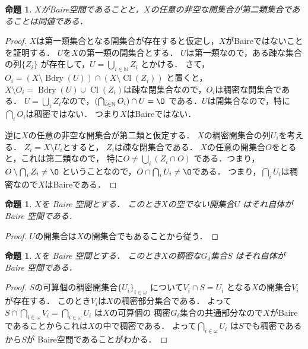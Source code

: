 \documentclass[leqno, 12pt]{jsarticle}
\newtheorem{prop}[thm]{命題}
\newcommand{\nn}{\mathbb{N}}
\DeclareMathOperator{\bd}{Bdry}
\DeclareMathOperator{\cl}{Cl}
\newcommand{\myom}{\omega}
\begin{document}
\begin{prop}
$X$がBaire空間であることと，$X$の任意の非空な開集合が第二類集合であることは同値である．
\end{prop}
\begin{proof}
$X$は第一類集合となる開集合が存在すると仮定し，$X$がBaireではないことを証明する．
$U$を$X$の第一類の開集合とする．
$U$は第一類なので，ある疎な集合の列$\{Z_i\}$
が存在して，$U=\bigcup_{i\in \nn}Z_i$
とかける．
さて，$O_i=(X\setminus \bd(U))\cap (X\setminus\cl(Z_i))$
と置くと，$X\setminus O_i=\bd(U)\cup \cl(Z_i)$は疎な閉集合なので，$O_i$は稠密な開集合である．
$U=\bigcup_iZ_i$なので，$(\bigcap_{i\in \nn} O_i)\cap U=\O$
である．$U$は開集合なので，特に$\bigcap_{i}O_i$は稠密ではない．
つまり$X$はBaireではない．

逆に$X$の任意の非空な開集合が第二類と仮定する．
$X$の稠密開集合の列$U_i$を考える．
$Z_i=X\setminus U_i$とすると，
$Z_i$は疎な閉集合である．
$X$の任意の開集合$O$をとると，これは第二類なので，
特に$O\neq \bigcup_{i}(Z_i\cap O)$
である．つまり，$O\setminus \bigcap_i Z_i\neq \O$
ということなので，$O\cap \bigcap_iU_i\neq \O$である．
つまり，$\bigcap_iU_i$は稠密なので$X$はBaireである．
\end{proof}


\begin{prop}
$X$を
Baire 空間とする．
このとき$X$の空でない開集合$U$
はそれ自体がBaire 空間である．
\end{prop}
\begin{proof}
$U$の開集合は$X$の開集合でもあることから従う．
\end{proof}

\begin{prop}
$X$を
Baire 空間とする．
このとき$X$の稠密な$G_{\delta}$集合$S$
はそれ自体がBaire 空間である．
\end{prop}
\begin{proof}
$S$の可算個の稠密開集合$\{U_{i}\}_{i\in \myom}$
について$V_{i}\cap S=U_{i}$
となる$X$の開集合$V_{i}$
が存在する．
このとき$V_{i}$は$X$の稠密部分集合である．
よって
$S\cap \bigcap_{i\in \myom}V_{i}
=\bigcap_{i\in \myom}U_{i}$
は$X$の可算個の
稠密$G_{\delta}$集合の共通部分なので$X$がBaire
であることからこれは$X$の中で稠密である．
よって$\bigcap_{i\in \myom}U_{i}$
は$S$でも稠密であるから$S$が
Baire空間であることがわかる．
\end{proof}
\end{document}
